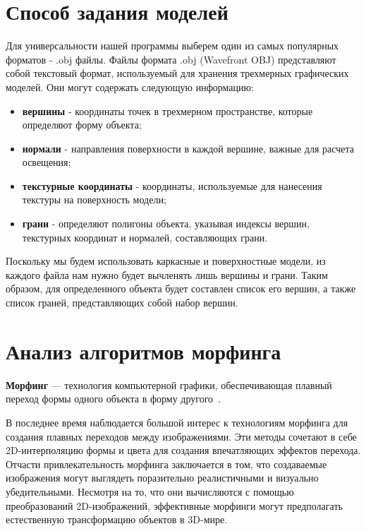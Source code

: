 \section[Способ задания моделей]{Способ задания моделей}
\label{sec:method_set_models}

Для универсальности нашей программы выберем один из самых популярных форматов - .obj файлы. 
Файлы формата .obj (Wavefront OBJ) представляют собой текстовый формат, используемый для хранения трехмерных графических 
моделей. 
Они могут содержать следующую информацию:
\begin{itemize}
	\item \textbf{вершины} - координаты точек в трехмерном пространстве, которые определяют форму объекта;
	\item \textbf{нормали} - направления поверхности в каждой вершине, важные для расчета освещения;
	\item \textbf{текстурные координаты} - координаты, используемые для нанесения текстуры на поверхность модели;
	\item \textbf{грани} - определяют полигоны объекта, указывая индексы вершин, текстурных координат и нормалей, составляющих грани.
\end{itemize}

Поскольку мы будем использовать каркасные и поверхностные модели, из каждого файла нам нужно будет вычленять лишь вершины и грани. 
Таким образом, для определенного объекта будет составлен список его вершин, а также список граней, представляющих собой набор вершин.

\section[Анализ алгоритмов морфинга]{Анализ алгоритмов морфинга}
\label{sec:morph_algo}
\textbf{Морфинг} --- технология компьютерной графики, обеспечивающая плавный переход формы одного объекта в форму другого~\cite{morph_spheres}.

В последнее время наблюдается большой интерес к технологиям морфинга для создания плавных переходов между изображениями. 
Эти методы сочетают в себе 2D-интерполяцию формы и цвета для создания впечатляющих эффектов перехода.
Отчасти привлекательность морфинга заключается в том, что создаваемые изображения могут выглядеть поразительно реалистичными и визуально убедительными. 
Несмотря на то, что они вычисляются с помощью преобразований 2D-изображений, эффективные морфинги могут предполагать естественную трансформацию объектов в 3D-мире.

